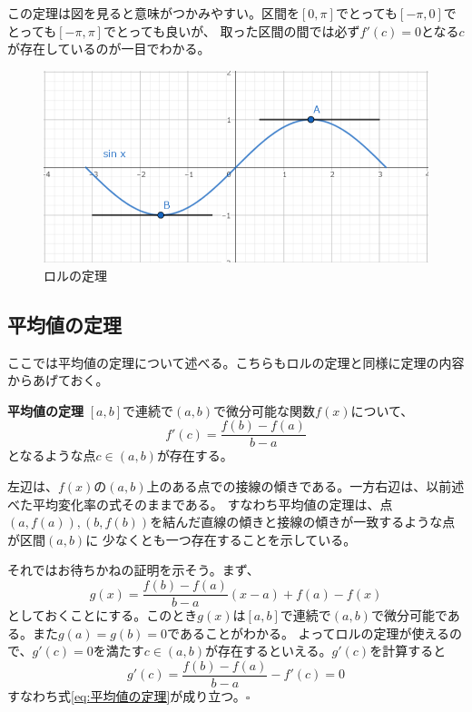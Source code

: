 \documentclass[a4j,dvipdfmx]{jsarticle}
\begin{document}
                    この定理は図を見ると意味がつかみやすい。区間を$[0,\pi]$でとっても$[-\pi,0]$でとっても$[-\pi,\pi]$でとっても良いが、
                    取った区間の間では必ず$f'(c)=0$となる$c$が存在しているのが一目でわかる。

                    \begin{figure}[h]
                        \centering
                        \includegraphics[scale=0.5]{img/QuuNote/rollTheory.png}
                        \caption{ロルの定理}
                    \end{figure}
                \clearpage
                \subsection{平均値の定理}
                    ここでは平均値の定理について述べる。こちらもロルの定理と同様に定理の内容からあげておく。
                    \begin{itembox}{\textbf{平均値の定理}}
                        $[a,b]$で連続で$(a,b)$で微分可能な関数$f(x)$について、
                        \begin{equation}
                            f'(c)=\frac{f(b)-f(a)}{b-a}\label{eq:平均値の定理}
                        \end{equation}
                        となるような点$c\in(a,b)$が存在する。
                    \end{itembox}
                    左辺は、$f(x)$の$(a,b)$上のある点での接線の傾きである。一方右辺は、以前述べた平均変化率の式そのままである。
                    すなわち平均値の定理は、点$(a,f(a)),(b,f(b))$を結んだ直線の傾きと接線の傾きが一致するような点が区間$(a,b)$に
                    少なくとも一つ存在することを示している。

                    それではお待ちかねの証明を示そう。まず、
                    \begin{equation*}
                        g(x)=\frac{f(b)-f(a)}{b-a}(x-a)+f(a)-f(x)
                    \end{equation*}
                    としておくことにする。このとき$g(x)$は$[a,b]$で連続で$(a,b)$で微分可能である。また$g(a)=g(b)=0$であることがわかる。
                    よってロルの定理が使えるので、$g'(c)=0$を満たす$c\in(a,b)$が存在するといえる。$g'(c)$を計算すると
                    \begin{equation*}
                        g'(c)=\frac{f(b)-f(a)}{b-a}-f'(c)=0
                    \end{equation*}
                    すなわち式\eqref{eq:平均値の定理}が成り立つ。$\square$
\end{document}
